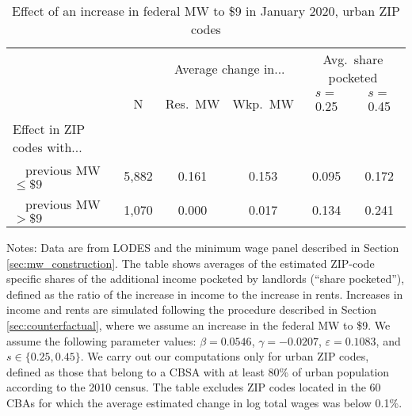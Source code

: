 \begin{table}[hbt!]
    \centering
    \caption{Effect of an increase in federal MW to \$9 in January 2020, urban ZIP codes}
    \label{tab:counterfactuals_fed_9usd}

    \begin{tabular}{@{}lccccc@{}}
        \toprule
                            &   & \multicolumn{2}{c}{Average change in...}
                                & \multicolumn{2}{c}{Avg.\ share pocketed}       \\ \cmidrule(lr){3-4}\cmidrule(lr){5-6}
                            & N & Res.\ MW & Wkp.\ MW
                            & $s = $ 0.25  & $s = $ 0.45                           \\ \midrule
        Effect in ZIP codes with...          &      &       &       &     &      \\
        $\quad$previous MW $\leq\$9\quad$    & 5,882 &  0.161 & 0.153  & 0.095 &  0.172   \\
        $\quad$previous MW $>\$9\quad$       & 1,070 &  0.000 & 0.017  & 0.134 & 0.241    \\ \bottomrule
    \end{tabular}
    
    \begin{minipage}{.95\textwidth} \footnotesize
        \vspace{2mm}
        Notes: 
        Data are from LODES and the minimum wage panel described in Section 
        \ref{sec:mw_construction}.
        The table shows averages of the estimated ZIP-code specific shares of the 
        additional income pocketed by landlords (``share pocketed''),
        defined as the ratio of the increase in income to the increase in rents.
        Increases in income and rents are simulated following the procedure
        described in Section \ref{sec:counterfactual}, where we assume 
        an increase in the federal MW to \$9.
        We assume the following parameter values: 
        $\beta = 0.0546$, $\gamma = -0.0207$, $\varepsilon = 0.1083$, and 
        $s\in\{0.25, 0.45\}$.
        We carry out our computations only for urban ZIP codes, defined as 
        those that belong to a CBSA with at least 80\% of urban population
        according to the 2010 census.
        The table excludes ZIP codes located in the 60 CBAs for which the average
        estimated change in log total wages was below 0.1\%.
    \end{minipage}
\end{table}
